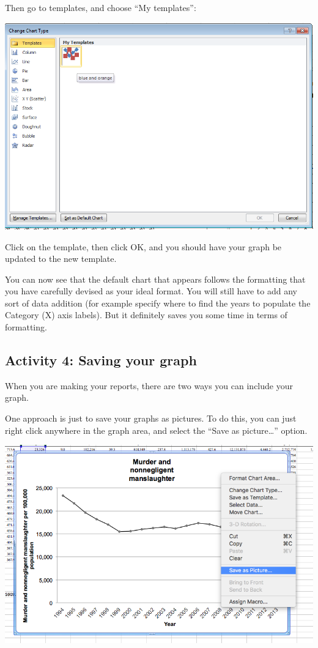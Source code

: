 \documentclass[]{book}
\theoremstyle{definition}
\theoremstyle{definition}
\theoremstyle{definition}
\theoremstyle{remark}
\begin{document}
Then go to templates, and choose ``My templates'':

\includegraphics{imgs/pc_my_templates.png}

Click on the template, then click OK, and you should have your graph be
updated to the new template.

You can now see that the default chart that appears follows the
formatting that you have carefully devised as your ideal format. You
will still have to add any sort of data addition (for example specify
where to find the years to populate the Category (X) axis labels). But
it definitely saves you some time in terms of formatting.

\hypertarget{activity-4-saving-your-graph}{%
\subsection{Activity 4: Saving your
graph}\label{activity-4-saving-your-graph}}

 When you are making your reports, there are two ways you can include
your graph.

One approach is just to save your graphs as pictures. To do this, you
can just right click anywhere in the graph area, and select the ``Save
as picture\ldots{}'' option.

\includegraphics{imgs/save_as_pic.png}
\end{document}

